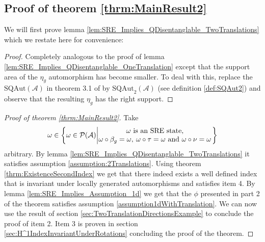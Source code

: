 \documentclass[12pt,a4paper,twoside]{article}
\let\originalleft\left
\let\originalright\right
\renewcommand{\left}{\mathopen{}\mathclose\bgroup\originalleft}
\renewcommand{\right}{\aftergroup\egroup\originalright}
\newcommand{\PP}{\mathcal P}
\renewcommand{\AA}{\mathcal A}
\theoremstyle{definition}
\numberwithin{equation}{section}
\begin{document}
\subsection{Proof of theorem \ref{thrm:MainResult2}}\label{sec:ProofOfMainResult2}
We will first prove lemma \ref{lem:SRE_Implies_QDisentanglable_TwoTranslations} which we restate here for convenience:
\SREImpliesQDisentanglableTwoTranslations*
\begin{proof}
	Completely analogous to the proof of lemma \ref{lem:SRE_Implies_QDisentanglable_OneTranslation} except that the support area of the $\eta_g$ automorphism has become smaller. To deal with this, replace the $\textrm{SQAut}(\AA)$ in theorem 3.1 of \cite{ogata2021h3gmathbb} by $\textrm{SQAut}_2(\AA)$ (see definition \ref{def:SQAut2}) and observe that the resulting $\eta_g$ has the right support.
\end{proof}
\begin{proof}[Proof of theorem \ref{thrm:MainResult2}]
	Take
	\begin{equation}
	\omega\in\left\{\omega\in\PP(\AA)\left| \begin{matrix}\omega\text{ is an SRE state,}\\\omega\circ\beta_g=\omega,\:\omega\circ\tau=\omega\text{ and }\omega\circ\nu=\omega\end{matrix} \right.\right\}
	\end{equation}
	arbitrary. By lemma \ref{lem:SRE_Implies_QDisentanglable_TwoTranslations} it satisfies assumption \ref{assumption:2Translations}. Using theorem \ref{thrm:ExistenceSecondIndex} we get that there indeed exists a well defined index that is invariant under locally generated automorphisms and satisfies item 4. By lemma \ref{lem:SRE_Implies_Assumption_1d} we get that the $\phi$ presented in part 2 of the theorem satisfies assumption \ref{assumption1dWithTranslation}. We can now use the result of section \ref{sec:TwoTranslationDirectionsExample} to conclude the proof of item 2. Item 3 is proven in section \ref{sec:H^1IndexInvariantUnderRotations} concluding the proof of the theorem.
\end{proof}
\appendix
\end{document}
